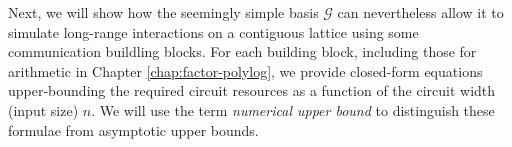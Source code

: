 Next, we will show how the
seemingly simple basis $\mathcal{G}$ can nevertheless allow it to simulate
long-range interactions on a contiguous lattice using some
communication buildling blocks.
For each building block, including those for arithmetic in
Chapter \ref{chap:factor-polylog},
we provide closed-form equations upper-bounding the required circuit
resources as a function of the circuit width (input size) $n$.
We will use the
term \emph{numerical upper bound} to distinguish these formulae from asymptotic
upper bounds.
